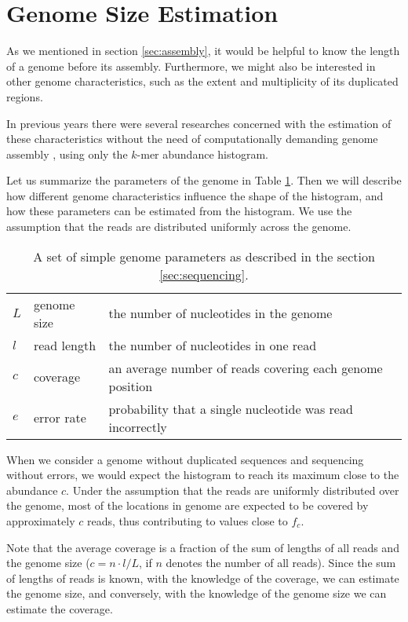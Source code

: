 \section{Genome Size Estimation}
\label{sec:intro-estimation}
As we mentioned in section \ref{sec:assembly}, it would be helpful to know the length of a genome 
before its assembly. Furthermore, we might also be interested in other genome characteristics,
such as the extent and multiplicity of its duplicated regions.

In previous years there were several researches concerned with the estimation 
of these characteristics without the need of computationally demanding 
genome assembly \cite{Hozza2015, Williams2013, Melsted2014, Sivadasan2016}, using only the $k$-mer 
abundance histogram.

\medskip

Let us summarize the parameters of the genome in Table \ref{tab:genome-parameters}.
Then we will describe how different genome characteristics influence the shape of the histogram,
and how these parameters can be estimated from the histogram. We use the assumption that
the reads are distributed uniformly across the genome. 

\begin{table}[h!]
\centering
\begin{tabular}{ l l l }
 $L$ & genome size & the number of nucleotides in the genome \\  
 $l$ & read length & the number of nucleotides in one read \\
 $c$ & coverage & an average number of reads covering each genome position \\ 
 $e$ & error rate & probability that a single nucleotide was read incorrectly   
\end{tabular}
\caption[Genome parameters]{A set of simple genome parameters as described in the section \ref{sec:sequencing}.
\label{tab:genome-parameters}}
\end{table}

When we consider a genome without duplicated sequences and sequencing without errors, we
would expect the histogram to reach its maximum close to the abundance $c$.
Under the assumption that the reads are uniformly distributed over the genome,
most of the locations in genome are expected to be covered by approximately $c$ reads,
thus contributing to values close to $f_c$.

Note that the average coverage is a fraction of the sum of lengths of all reads
and the genome size ($c = n \cdot l/L$, if $n$ denotes the number of all reads). 
Since the sum of lengths of reads is known, with the knowledge of the coverage, we can estimate the 
genome size, and conversely, with the knowledge of the genome size we can estimate the coverage.

